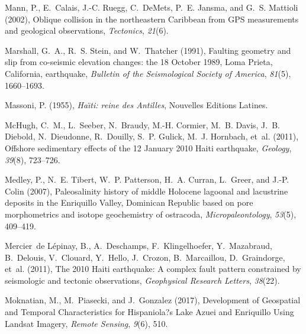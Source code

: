 \documentclass[linenumbers,draft]{agujournal}
\begin{document}
\begin{thebibliography}{62}
Mann, P., E.~Calais, J.-C. Ruegg, C.~DeMets, P.~E. Jansma, and G.~S. Mattioli
  (2002), Oblique collision in the northeastern {Caribbean from GPS}
  measurements and geological observations, \textit{Tectonics}, \textit{21}(6).

Marshall, G.~A., R.~S. Stein, and W.~Thatcher (1991), {Faulting geometry and
  slip from co-seismic elevation changes: the 18 October 1989, Loma Prieta,
  California, earthquake}, \textit{Bulletin of the Seismological Society of
  America}, \textit{81}(5), 1660--1693.

Massoni, P. (1955), \textit{Ha{\"\i}ti: reine des {Antilles}}, Nouvelles
  Editions Latines.

McHugh, C.~M., L.~Seeber, N.~Braudy, M.-H. Cormier, M.~B. Davis, J.~B. Diebold,
  N.~Dieudonne, R.~Douilly, S.~P. Gulick, M.~J. Hornbach, et~al. (2011),
  Offshore sedimentary effects of the 12 {January 2010 Haiti} earthquake,
  \textit{Geology}, \textit{39}(8), 723--726.

Medley, P., N.~E. Tibert, W.~P. Patterson, H.~A. Curran, L.~Greer, and J.-P.
  Colin (2007), {Paleosalinity history of middle Holocene lagoonal and
  lacustrine deposits in the Enriquillo Valley, Dominican Republic based on
  pore morphometrics and isotope geochemistry of ostracoda},
  \textit{Micropaleontology}, \textit{53}(5), 409--419.

Mercier~de L{\'e}pinay, B., A.~Deschamps, F.~Klingelhoefer, Y.~Mazabraud,
  B.~Delouis, V.~Clouard, Y.~Hello, J.~Crozon, B.~Marcaillou, D.~Graindorge,
  et~al. (2011), {The 2010 Haiti earthquake: A complex} fault pattern
  constrained by seismologic and tectonic observations, \textit{Geophysical
  Research Letters}, \textit{38}(22).

Moknatian, M., M.~Piasecki, and J.~Gonzalez (2017), {Development of Geospatial
  and Temporal Characteristics for Hispaniola?s Lake Azuei and Enriquillo Using
  Landsat Imagery}, \textit{Remote Sensing}, \textit{9}(6), 510.


\end{thebibliography}
\end{document}
